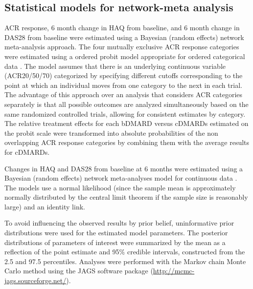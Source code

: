 \documentclass[11pt,final,fleqn]{article}\usepackage[]{graphicx}\usepackage[]{color}
\theoremstyle{plain}
\begin{document}
\begin{appendices}


\subsection{Statistical models for network-meta analysis}\label{app:nma-statistical-models}

ACR response, 6 month change in HAQ from baseline, and 6 month change in DAS28 from baseline were estimated using a Bayesian (random effects) network meta-analysis approach. The four mutually exclusive ACR response categories were estimated using a ordered probit model appropriate for ordered categorical data \citep{dias2013evidence}. The model assumes that there is an underlying continuous variable (ACR20/50/70) categorized by specifying different cutoffs corresponding to the point at which an individual moves from one category to the next in each trial. The advantage of this approach over an analysis that considers ACR categories separately is that all possible outcomes are analyzed simultaneously based on the same randomized controlled trials, allowing for consistent estimates by category. The relative treatment effects for each bDMARD versus cDMARDs estimated on the probit scale were transformed into absolute probabilities of the non overlapping ACR response categories by combining them with the average results for cDMARDs.

Changes in HAQ and DAS28 from baseline at 6 months were estimated using a Bayesian (random effects) network meta-analyses model for continuous data \citep{dias2013evidence}. The models use a normal likelihood (since the sample mean is approximately normally distributed by the central limit theorem if the sample size is reasonably large) and an identity link. 

To avoid influencing the observed results by prior belief, uninformative prior distributions were used for the estimated model parameters. The posterior distributions of parameters of interest were summarized by the mean as a reflection of the point estimate and 95\% credible intervals, constructed from the 2.5 and 97.5 percentiles. Analyses were performed with the Markov chain Monte Carlo method using the JAGS software package (\url{http://mcmc-jags.sourceforge.net/}).


\end{appendices}
\end{document}

